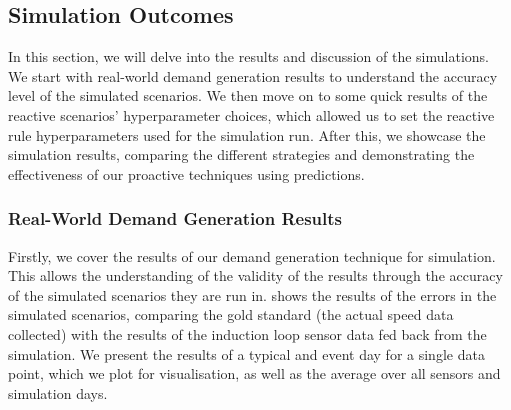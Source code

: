 \subsection{Simulation Outcomes}
In this section, we will delve into the results and discussion of the simulations. We start with real-world demand generation results to understand the accuracy level of the simulated scenarios. We then move on to some quick results of the reactive scenarios’ hyperparameter choices, which allowed us to set the reactive rule hyperparameters used for the simulation run. After this, we showcase the simulation results, comparing the different strategies and demonstrating the effectiveness of our proactive techniques using predictions.

\subsubsection{Real-World Demand Generation Results}
\label{link:demand-results}
Firstly, we cover the results of our demand generation technique for simulation. This allows the understanding of the validity of the results through the accuracy of the simulated scenarios they are run in.  shows the results of the errors in the simulated scenarios, comparing the gold standard (the actual speed data collected) with the results of the induction loop sensor data fed back from the simulation. We present the results of a typical and event day for a single data point, which we plot for visualisation, as well as the average over all sensors and simulation days.

\begin{table}[!ht]
    \centering
    \caption{Real-World Demand Generation Error Metrics}
    \label{table:demand-results}
\end{table}

